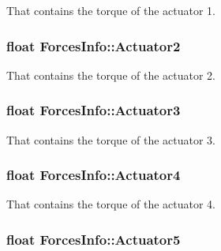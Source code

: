That contains the torque of the actuator 1. 

\subsubsection[{\texorpdfstring{Actuator2}{Actuator2}}]{\setlength{\rightskip}{0pt plus 5cm}float Forces\+Info\+::\+Actuator2}\hypertarget{struct_forces_info_a5a0dd34e95a333cd094c2de924216850}{}\label{struct_forces_info_a5a0dd34e95a333cd094c2de924216850}


That contains the torque of the actuator 2. 

\subsubsection[{\texorpdfstring{Actuator3}{Actuator3}}]{\setlength{\rightskip}{0pt plus 5cm}float Forces\+Info\+::\+Actuator3}\hypertarget{struct_forces_info_acc271f53f83035f2ffc34b9b9f0ce057}{}\label{struct_forces_info_acc271f53f83035f2ffc34b9b9f0ce057}


That contains the torque of the actuator 3. 

\subsubsection[{\texorpdfstring{Actuator4}{Actuator4}}]{\setlength{\rightskip}{0pt plus 5cm}float Forces\+Info\+::\+Actuator4}\hypertarget{struct_forces_info_a3e618674ddfe08d0f70224e365a7f1b4}{}\label{struct_forces_info_a3e618674ddfe08d0f70224e365a7f1b4}


That contains the torque of the actuator 4. 

\subsubsection[{\texorpdfstring{Actuator5}{Actuator5}}]{\setlength{\rightskip}{0pt plus 5cm}float Forces\+Info\+::\+Actuator5}\hypertarget{struct_forces_info_adb02a0b17096da89857031a95ac625ae}{}\label{struct_forces_info_adb02a0b17096da89857031a95ac625ae}


